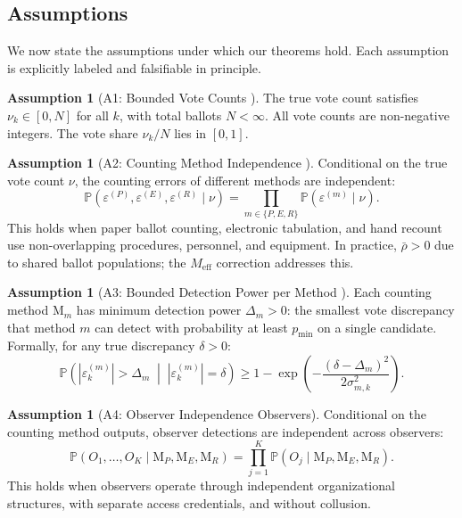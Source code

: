 \documentclass[11pt,a4paper]{article}
\theoremstyle{definition}
\newtheorem{assumption}[theorem]{Assumption}
\newcommand{\Pbb}{\mathbb{P}}
\newcommand{\method}[1]{\mathrm{M}_{#1}}
\begin{document}
\subsection{Assumptions}
We now state the assumptions under which our theorems hold. Each assumption is explicitly labeled and falsifiable in principle.
\begin{assumption}[A1: Bounded Vote Counts ]
\label{ass:A1}
The true vote count satisfies $\nu_k \in [0, N]$ for all $k$, with total ballots $N < \infty$. All vote counts are non-negative integers. The vote share $\nu_k / N$ lies in $[0, 1]$.
\end{assumption}
\begin{assumption}[A2: Counting Method Independence ]
\label{ass:A2}
Conditional on the true vote count $\nu$, the counting errors of different methods are independent:
\begin{equation}
    \Pbb(\varepsilon^{(P)}, \varepsilon^{(E)}, \varepsilon^{(R)} \mid \nu) = \prod_{m \in \{P, E, R\}} \Pbb(\varepsilon^{(m)} \mid \nu).
    \label{eq:method_independence}
\end{equation}
This holds when paper ballot counting, electronic tabulation, and hand recount use non-overlapping procedures, personnel, and equipment. In practice, $\bar{\rho} > 0$ due to shared ballot populations; the $M_{\text{eff}}$ correction addresses this.
\end{assumption}
\begin{assumption}[A3: Bounded Detection Power per Method ]
\label{ass:A3}
Each counting method $\method{m}$ has minimum detection power $\Delta_m > 0$: the smallest vote discrepancy that method $m$ can detect with probability at least $p_{\min}$ on a single candidate. Formally, for any true discrepancy $\delta > 0$:
\begin{equation}
    \Pbb\left(|\varepsilon_k^{(m)}| > \Delta_m \;\middle|\; |\varepsilon_k^{(m)}| = \delta\right) \geq 1 - \exp\left(-\frac{(\delta - \Delta_m)^2}{2\sigma_{m,k}^2}\right).
    \label{eq:detection_power}
\end{equation}
\end{assumption}
\begin{assumption}[A4: Observer Independence Observers]
\label{ass:A4}
Conditional on the counting method outputs, observer detections are independent across observers:
\begin{equation}
    \Pbb(O_1, \ldots, O_K \mid \method{P}, \method{E}, \method{R}) = \prod_{j=1}^{K} \Pbb(O_j \mid \method{P}, \method{E}, \method{R}).
    \label{eq:observer_independence}
\end{equation}
This holds when observers operate through independent organizational structures, with separate access credentials, and without collusion.
\end{assumption}
\end{document}
